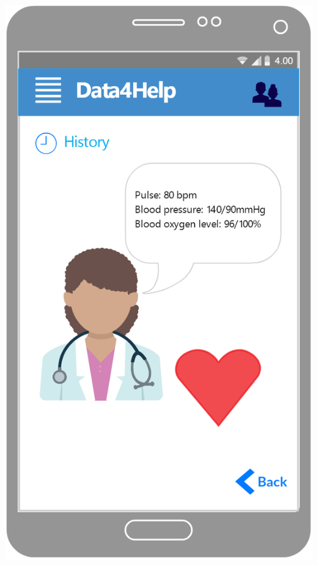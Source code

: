 \begin{center}
\begin{minipage}[c]{.40\textwidth}
\centering
\includegraphics[width=1\textwidth]{Images/userInterface/HealthStatus}
\end{minipage}%
\hspace{10mm}%
\begin{minipage}[c]{.40\textwidth}
\centering

\end{minipage}
\end{center}
